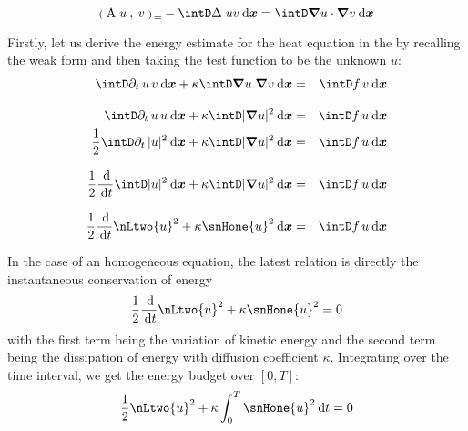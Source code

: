 \begin{equation*}
\InnerP{\matA\;u}{v} = - \intD \Delta\;u v \dxx = \intD \Grad u \cdot \Grad v \dxx
\end{equation*}

Firstly, let us derive the energy estimate for the heat equation in the by recalling the weak form and then taking the test function to be the unknown $u$:
\begin{eqnarray*}
\intD \pdt u\, v \dxx + \kappa \intD \Grad u . \Grad v \dxx &=& \intD f\,v \dxx \\[2ex]
\intD \pdt u\, u \dxx + \kappa \intD | \Grad u |^2 \dxx &=& \intD f\,u \dxx \\
\dfrac{1}{2}\intD \pdt |u|^2 \dxx + \kappa \intD | \Grad u |^2 \dxx &=& \intD f\,u \dxx \\[2ex]
\dfrac{1}{2} \ddd{t} \intD  |u|^2 \dxx + \kappa \intD | \Grad u |^2 \dxx &=& \intD f\,u \dxx \\[2ex]
\dfrac{1}{2} \ddd{t} \nLtwo{u}^2 + \kappa \snHone{u}^2 \dxx &=& \intD f\,u \dxx
\end{eqnarray*}

In the case of an homogeneous equation, the latest relation is directly the instantaneous conservation of energy
\begin{equation}
\dfrac{1}{2} \ddd{t} \nLtwo{u}^2 + \kappa \snHone{u}^2 = 0
\end{equation}
with the first term being the variation of kinetic energy and the second term being the dissipation of energy with diffusion coefficient $\kappa$.
Integrating over the time interval, we get the energy budget over $[0,T]$:
\begin{equation}\label{eq:energy_budget}
\dfrac{1}{2} \nLtwo{u}^2 + \kappa \int_{0}^T \snHone{u}^2 \dt = 0
\end{equation}


